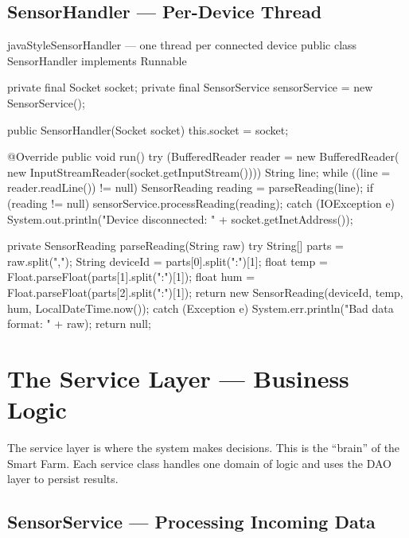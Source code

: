 \documentclass[12pt, a4paper]{report}
\begin{document}
\section{SensorHandler --- Per-Device Thread}

\begin{codeblock}{javaStyle}{SensorHandler --- one thread per connected device}
public class SensorHandler implements Runnable {
    private final Socket socket;
    private final SensorService sensorService = new SensorService();

    public SensorHandler(Socket socket) {
        this.socket = socket;
    }

    @Override
    public void run() {
        try (BufferedReader reader = new BufferedReader(
                new InputStreamReader(socket.getInputStream()))) {
            String line;
            while ((line = reader.readLine()) != null) {
                SensorReading reading = parseReading(line);
                if (reading != null) {
                    sensorService.processReading(reading);
                }
            }
        } catch (IOException e) {
            System.out.println("Device disconnected: "
                + socket.getInetAddress());
        }
    }

    private SensorReading parseReading(String raw) {
        try {
            String[] parts = raw.split(",");
            String deviceId = parts[0].split(":")[1];
            float  temp     = Float.parseFloat(parts[1].split(":")[1]);
            float  hum      = Float.parseFloat(parts[2].split(":")[1]);
            return new SensorReading(deviceId, temp, hum,
                                     LocalDateTime.now());
        } catch (Exception e) {
            System.err.println("Bad data format: " + raw);
            return null;
        }
    }
}
\end{codeblock}


\chapter{The Service Layer --- Business Logic}

The service layer is where the system makes decisions. This is the ``brain'' of the Smart Farm. Each service class handles one domain of logic and uses the DAO layer to persist results.

\section{SensorService --- Processing Incoming Data}
\end{document}
